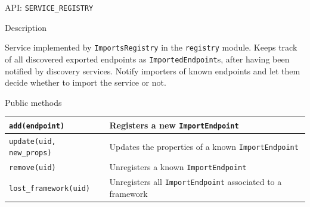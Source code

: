 \begin{frame}{API: \texttt{SERVICE\_REGISTRY}}
\begin{block}{Description}
\begin{small}
Service implemented by \texttt{ImportsRegistry} in the \texttt{registry} module.
Keeps track of all discovered exported endpoints as \texttt{ImportedEndpoint}s, after having been notified by discovery services.
Notify importers of known endpoints and let them decide whether to import the service or not.
\end{small}
\end{block}

\begin{block}{Public methods}
\begin{small}
\begin{tabular}{lp{}}
\texttt{add(endpoint)} & Registers a new \texttt{ImportEndpoint} \\
\hline
\texttt{update(uid, new\_props)} & Updates the properties of a known \texttt{ImportEndpoint}\\
\hline
\texttt{remove(uid)} & Unregisters a known \texttt{ImportEndpoint}\\
\hline
\texttt{lost\_framework(uid)} & Unregisters all \texttt{ImportEndpoint} associated to a framework\\
\end{tabular}
\end{small}
\end{block}
\end{frame}

